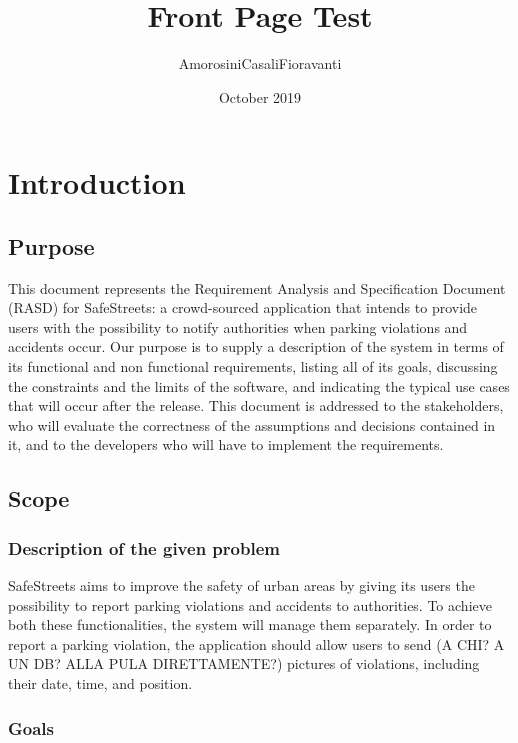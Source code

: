 \documentclass{report}
\title{Front Page Test}
\author{AmorosiniCasaliFioravanti}
\date{October 2019}
\begin{document}
\maketitle 
\tableofcontents
\chapter{Introduction}
\section{Purpose}
This document represents the Requirement Analysis and Specification Document (RASD) for SafeStreets: a crowd-sourced application that intends to provide users with the possibility to notify authorities when parking violations and accidents occur. Our purpose is to supply a description of the system in terms of its functional and non functional requirements, listing all of its goals, discussing the constraints and the limits of the software, and indicating the typical use cases that will occur after the release. This document is addressed to the stakeholders, who will evaluate the correctness of the assumptions and decisions contained in it, and to the developers who will have to implement the requirements.
\section{Scope}
\subsection{Description of the given problem}
SafeStreets aims to improve the safety of urban areas by giving its users the possibility to report parking violations and accidents to authorities. To achieve both these functionalities, the system will manage them separately. In order to report a parking violation, the application should allow users to send (A CHI? A UN DB? ALLA PULA DIRETTAMENTE?) pictures of violations, including their date, time, and position.
\subsection{Goals}
\end{document}

